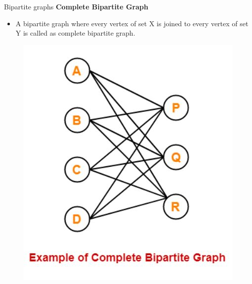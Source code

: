 \documentclass{beamer}
\begin{document}
\begin{frame}{Bipartite graphs}
	\textbf{Complete Bipartite Graph}
	\begin{itemize}
		\item A bipartite graph where every vertex of set X is joined to every vertex of set Y
		is called as complete bipartite graph.
	\end{itemize}
	\begin{figure}
		\includegraphics[scale=.5]{img/m16}
	\end{figure}
\end{frame}
\end{document}
